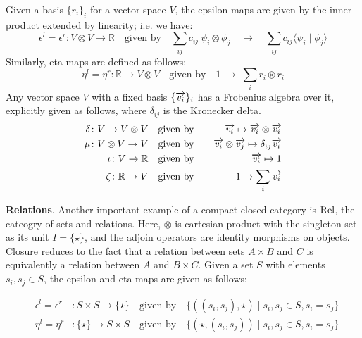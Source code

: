 \documentclass[a4paper,11pt]{easychair}
\begin{document}
Given a basis $\{r_i\}_i$ for a vector space $V$, the epsilon maps are
given by the inner product extended by linearity; i.e. we have:
\[
\epsilon^l  =  \epsilon^r \colon   V \otimes V \to \mathbb{R} \quad \mbox{given by} \quad
\sum_{ij} c_{ij} \ \psi_i \otimes \phi_j  \quad \mapsto \quad \sum_{ij} c_{ij} \langle \psi_i \mid \phi_j \rangle\]
Similarly, eta maps   are defined as follows:
\[
\eta^l = \eta^r \colon   \mathbb{R} \to V \otimes V
\quad \mbox{given by} \quad 
1 \; \mapsto \; \sum_i r_i \otimes r_i
\]
Any vector space $V$ with a fixed basis
$\{\overrightarrow{v_i}\}_i$ has a Frobenius algebra over it, explicitly given as follows, where $\delta_{ij}$ is the Kronecker delta.
\begin{eqnarray*}\label{eq:frob}
\delta  \colon V \to V \otimes V  & \quad \mbox{given by} \quad&  \overrightarrow{v_i} \mapsto \overrightarrow{v_i} \otimes \overrightarrow{v_i} \\
\mu \colon V \otimes V \to V  &\quad \mbox{given by} \quad & \overrightarrow{v_i} \otimes \overrightarrow{v_j} \mapsto 
\delta_{ij}\overrightarrow{v_i} \\
  \iota \colon V \to \mathbb{R} & \quad \mbox{given by} \quad&  \overrightarrow{v_i} \mapsto 1 \\
 \zeta \colon \mathbb{R} \to V  &\quad \mbox{given by} \quad& 1 \mapsto   \sum_i  \overrightarrow{v_i}  
\end{eqnarray*}




\medskip
\noindent
{\bf Relations}.
Another important example of a  compact closed category is
$\mathrm{Rel}$, the cateogry of sets and relations. Here, $\otimes$ is
cartesian product with the singleton set as its unit $I = \{\star\}$, and the adjoin operators  are identity morphisms on objects. Closure reduces to the
fact that a relation between sets $A\times B$ and $C$ is equivalently a relation between $A$ and $B \times C$.   Given a set $S$ with elements $s_i, s_j \in S$,  the epsilon and eta maps are given as follows:

\begin{eqnarray*}
&\epsilon^l  =  \epsilon^r &\colon   S \times S \to \{\star\} \quad \mbox{given by} \quad
\{((s_i, s_j), \star) \mid s_i, s_j \in S, s_i = s_j \}\\
&\eta^l = \eta^r& \colon   \{\star\}  \to S \times S
\quad \mbox{given by} \quad 
\{(\star, (s_i, s_j)) \mid s_i, s_j \in S, s_i = s_j\}
\end{eqnarray*}
\end{document}

